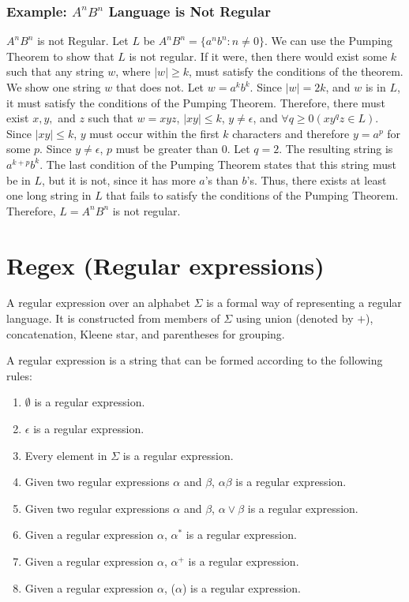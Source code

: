 \documentclass[hidelinks,12pt]{article}
\begin{document}
\subsubsection{Example: $A^nB^n$ Language is Not Regular }

$A^nB^n$ is not Regular. Let $L$ be $A^nB^n = \{a^nb^n : n \neq 0\}$. We can
use the Pumping Theorem to show that $L$ is not regular. If it were, then there
would exist some $k$ such that any string $w$, where $|w| \geq k$, must satisfy
the conditions of the theorem. We show one string $w$ that does not. Let $w =
a^kb^k$. Since $|w| = 2k$, and $w$ is in $L$, it must satisfy the conditions of
the Pumping Theorem. Therefore, there must exist $x, y,$ and $z$ such that $w =
xyz$, $|xy| \leq k$, $y \neq \epsilon$, and $\forall q \geq 0 (xy^qz \in L)$.
Since $|xy| \leq k$, $y$ must occur within the first $k$ characters and
therefore $y = a^p$ for some $p$. Since $y \neq \epsilon$, $p$ must be greater
than $0$. Let $q = 2$. The resulting string is $a^{k+p}b^k$. The last condition
of the Pumping Theorem states that this string must be in $L$, but it is not,
since it has more $a$’s than $b$’s. Thus, there exists at least one long string
in $L$ that fails to satisfy the conditions of the Pumping Theorem. Therefore,
$L = A^nB^n$ is not regular.


\section{Regex (Regular expressions)}

A regular expression over an alphabet $\Sigma$ is a formal way of representing
a regular language. It is constructed from members of $\Sigma$ using union
(denoted by $+$), concatenation, Kleene star, and parentheses for grouping.

A regular expression is a string that can be formed according to the following rules:
\begin{enumerate}
    \item $\emptyset$ is a regular expression.
    \item $\epsilon$ is a regular expression.
    \item Every element in $\Sigma$ is a regular expression.
    \item Given two regular expressions $\alpha$ and $\beta$, $\alpha\beta$ is a regular expression.
    \item Given two regular expressions $\alpha$ and $\beta$, $\alpha \lor \beta$ is a regular expression.
    \item Given a regular expression $\alpha$, $\alpha^*$ is a regular expression.
    \item Given a regular expression $\alpha$, $\alpha^+$ is a regular expression.
    \item Given a regular expression $\alpha$, ($\alpha$) is a regular expression.
\end{enumerate}
\end{document}
